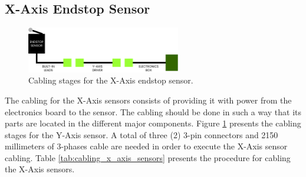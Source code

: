 \documentclass{article}
\begin{document}
\subsection{X-Axis Endstop Sensor}
\begin{figure}[H]
    \centering
    \includegraphics[width=0.6\textwidth]{images/cabling/x_axis_sensors_cabling.pdf}
    \caption{Cabling stages for the X-Axis endstop sensor.}
    \label{fig:cabling_x_axis_sensors}
\end{figure}
The cabling for the X-Axis sensors consists of providing it with power from the electronics board to the sensor. The cabling should be done in such a way that its parts are located in the different major components. Figure \ref{fig:cabling_x_axis_sensors} presents the cabling stages for the Y-Axis sensor. A total of three (2) 3-pin connectors and 2150 millimeters of 3-phases cable are needed in order to execute the X-Axis sensor cabling. Table \ref{tab:cabling_x_axis_sensors} presents the procedure for cabling the X-Axis sensors.
\end{document}
